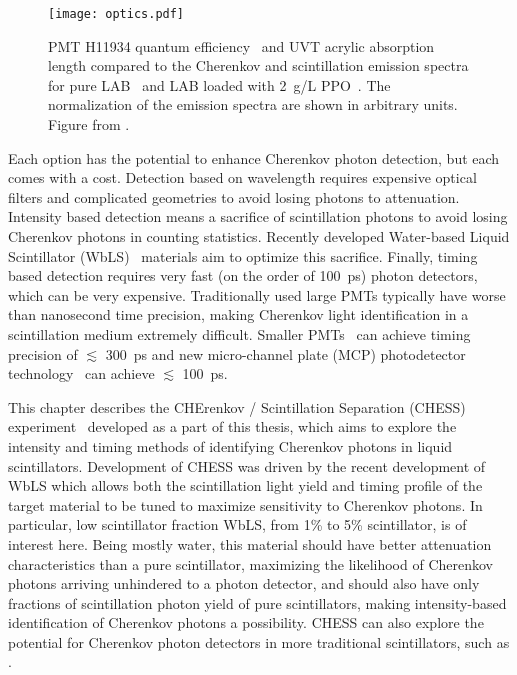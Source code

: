 \begin{figure}
	\centering
	\texttt{[image: optics.pdf]}
	\caption{\label{fig:optics} PMT H11934 quantum efficiency~\cite{h11934} and UVT acrylic absorption length compared to the Cherenkov and scintillation emission spectra for pure LAB~\cite{lab_emission} and LAB loaded with 2~g/L PPO~\cite{snop_private}. The normalization of the emission spectra are shown in arbitrary units. Figure from \cite{chess_nim}.}
\end{figure}

Each option has the potential to enhance Cherenkov photon detection, but each comes with a cost.
Detection based on wavelength requires expensive optical filters and complicated geometries to avoid losing photons to attenuation.
Intensity based detection means a sacrifice of scintillation photons to avoid losing Cherenkov photons in counting statistics.
Recently developed Water-based Liquid Scintillator (WbLS)~\cite{wbls} materials aim to optimize this sacrifice.
Finally, timing based detection requires very fast (on the order of 100~ps) photon detectors, which can be very expensive.
Traditionally used large PMTs typically have worse than nanosecond time precision, making Cherenkov light identification in a scintillation medium extremely difficult. 
Smaller PMTs~\cite{h11934} can achieve timing precision of $\lesssim$ 300~ps and new micro-channel plate (MCP) photodetector technology~\cite{mcp, lappd, lappd2} can achieve  $\lesssim$ 100~ps.


This chapter describes the CHErenkov / Scintillation Separation (CHESS) experiment~\cite{chess_nim} developed as a part of this thesis, which aims to explore the intensity and timing methods of identifying Cherenkov photons in liquid scintillators. 
Development of CHESS was driven by the recent development of WbLS which allows both the scintillation light yield and timing profile of the target material to be tuned to maximize sensitivity to Cherenkov photons.  
In particular, low scintillator fraction WbLS, from 1\% to 5\% scintillator, is of interest here. 
Being mostly water, this material should have better attenuation characteristics than a pure scintillator, maximizing the likelihood of Cherenkov photons arriving unhindered to a photon detector, and should also have only fractions of scintillation photon yield of pure scintillators, making intensity-based identification of Cherenkov photons a possibility.
CHESS can also explore the potential for Cherenkov photon detectors in more traditional scintillators, such as {\labppo}.

